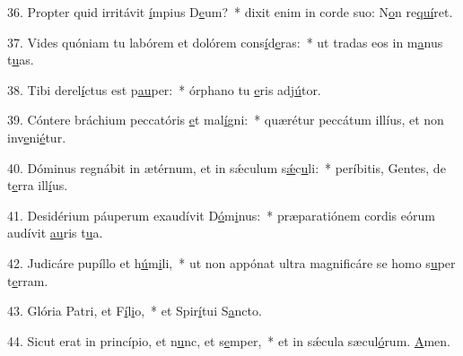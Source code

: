 36. Propter quid irritávit \uline{í}mpius D\uline{e}um?~* dixit enim in corde suo: N\uline{o}n re\uline{quí}ret.\par 
37. Vides quóniam tu labórem et dolórem cons\uline{í}d\uline{e}ras:~* ut tradas eos in m\uline{a}nus t\uline{u}as.\par 
38. Tibi derel\uline{í}ctus est p\uline{au}per:~* órphano tu \uline{e}ris adj\uline{ú}tor.\par 
39. Cóntere bráchium peccatóris \uline{e}t mal\uline{í}gni:~* quærétur peccátum illíus, et non inv\uline{e}ni\uline{é}tur.\par 
40. Dóminus regnábit in ætérnum, et in sǽculum s\uline{ǽ}c\uline{u}li:~* períbitis, Gentes, de t\uline{e}rra ill\uline{í}us.\par 
41. Desidérium páuperum exaudívit D\uline{ó}m\uline{i}nus:~* præparatiónem cordis eórum audívit \uline{au}ris t\uline{u}a.\par 
42. Judicáre pupíllo et h\uline{ú}m\uline{i}li,~* ut non appónat ultra magnificáre se homo s\uline{u}per t\uline{e}rram.\par 
43. Glória Patri, et F\uline{í}l\uline{i}o,~* et Spir\uline{í}tui S\uline{a}ncto.\par 
44. Sicut erat in princípio, et n\uline{u}nc, et s\uline{e}mper,~* et in sǽcula sæcul\uline{ó}rum. \uline{A}men.\par 
